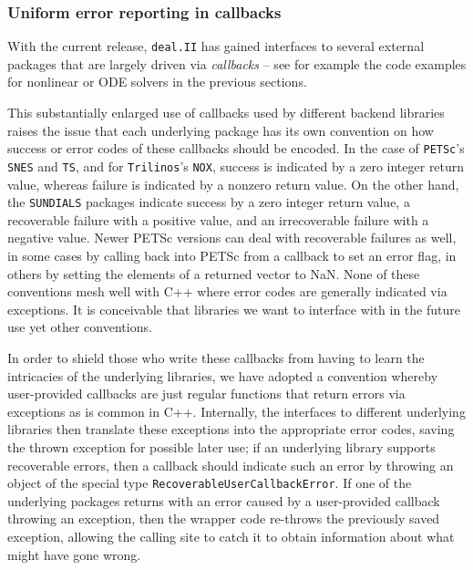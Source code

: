 \documentclass{ansarticle-preprint}
\newcommand{\specialword}[1]{\texttt{#1}}
\newcommand{\dealii}{{\specialword{deal.II}}\xspace}
\newcommand{\trilinos}{{\specialword{Trilinos}}\xspace}
\newcommand{\petsc}{\specialword{PETSc}\xspace}
\newcommand{\snes}{{\specialword{SNES}}\xspace}
\newcommand{\ts}{{\specialword{TS}}\xspace}
\newcommand{\sundials}{{\specialword{SUNDIALS}}\xspace}
\begin{document}
\subsubsection{Uniform error reporting in callbacks}\label{sec:callbacks}

With the current release, \dealii{} has gained interfaces to several
external packages that are largely driven via \textit{callbacks} --
see for example the code examples for nonlinear or ODE solvers in the previous sections.

This substantially enlarged use of callbacks used by different backend
libraries raises the issue that each underlying package has its own
convention on how success or error codes of these callbacks should be
encoded. In the case of \petsc{}'s \snes{} and \ts{}, and for \trilinos{}'s \texttt{NOX},
success is indicated by a zero integer return value, whereas failure is
indicated by a nonzero return value. On the other hand, the \sundials{}
packages indicate success by a zero integer return value, a
recoverable failure with a positive value, and an irrecoverable failure
with a negative value. Newer PETSc versions can deal with recoverable
failures as well, in some cases by calling back into PETSc from a
callback to set an error flag, in others by setting the elements of a
returned vector to NaN.
None of these conventions mesh well with C++
where error codes are generally indicated via exceptions.
It is conceivable that libraries we want to
interface with in the future use yet other conventions.

In order to shield those who write these callbacks from having to
learn the intricacies of the underlying libraries, we have adopted a
convention whereby user-provided callbacks are just regular functions
that return errors via exceptions as is common in C++. Internally, the
interfaces to different underlying libraries then translate these
exceptions into the appropriate error codes, saving the thrown exception for possible
later use; if an underlying library supports
recoverable errors, then a callback should indicate such an error by
throwing an object of the special type
\texttt{RecoverableUserCallbackError}. If one of the underlying
packages returns with an error caused by a user-provided callback
throwing an exception, then the wrapper code re-throws the previously
saved exception, allowing the calling site to catch it to obtain information
about what might have gone wrong.
\end{document}
